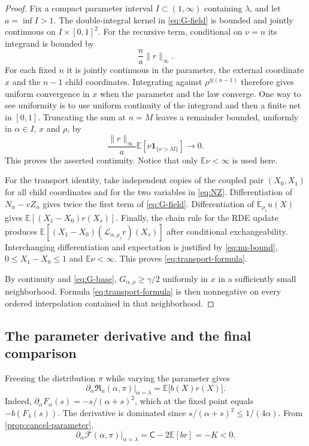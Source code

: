 \documentclass[11pt,a4paper]{article}
\numberwithin{equation}{section}
\theoremstyle{notethm}
\theoremstyle{definition}
\newcommand{\E}{\mathbb E}
\newcommand{\cL}{\mathcal L}
\newcommand{\cF}{\mathscr F}
\newcommand{\res}{\mathfrak R}
\begin{document}
\begin{proof}
Fix a compact parameter interval $I\subset(1,\infty)$ containing $\lambda$,
and let $a=\inf I>1$. The double-integral kernel in \eqref{eq:G-field} is
bounded and jointly continuous on $I\times[0,1]^2$.
For the recursive term, conditional on $\nu=n$ its integrand is bounded by
\begin{equation}\label{eq:nu-bound}
 \frac{n}{a}\|r\|_\infty.
\end{equation}
For each fixed $n$ it is jointly continuous in the parameter, the external
coordinate $x$ and the $n-1$ child coordinates. Integrating against
$\rho^{\otimes(n-1)}$ therefore gives uniform convergence in $x$ when the
parameter and the law converge. One way to see uniformity is to use uniform
continuity of the integrand and then a finite net in $[0,1]$.
Truncating the sum at $n=M$ leaves a remainder bounded, uniformly in
$\alpha\in I$, $x$ and $\rho$, by
\begin{equation}\label{eq:nu-tail}
 \frac{\|r\|_\infty}{a}\E[\nu\mathbf1_{\{\nu>M\}}]\longrightarrow0.
\end{equation}
This proves the asserted continuity. Notice that only $\E\nu<\infty$ is
used here.

For the transport identity, take independent copies of the coupled pair
$(X_0,X_1)$ for all child coordinates and for the two variables in
\eqref{eq:NZ}. Differentiation of $N_\alpha-vZ_\alpha$ gives twice the first
term of \eqref{eq:G-field}. Differentiation of $\E_{\rho_s}u(X)$ gives
$\E[(X_1-X_0)r(X_s)]$. Finally, the chain rule for the RDE update produces
$\E[(X_1-X_0)(\cL_{\alpha,\rho_s}r)(X_s)]$ after conditional
exchangeability. Interchanging differentiation and expectation is justified
by \eqref{eq:nu-bound}, $0\le X_1-X_0\le1$ and $\E\nu<\infty$.
This proves \eqref{eq:transport-formula}.

By continuity and \eqref{eq:G-base}, $G_{\alpha,\rho}\ge\gamma/2$ uniformly
in $x$ in a sufficiently small neighborhood. Formula
\eqref{eq:transport-formula} is then nonnegative on every ordered
interpolation contained in that neighborhood.
\end{proof}

\subsection{The parameter derivative and the final comparison}

Freezing the distribution $\pi$ while varying the parameter gives
\begin{equation}\label{eq:parameter-residual}
 \left.\partial_\alpha\res_u(\alpha,\pi)\right|_{\alpha=\lambda}
 =\E\bigl[b(X)r(X)\bigr].
\end{equation}
Indeed, $\partial_\alpha F_\alpha(s)=-s/(\alpha+s)^2$, which at the fixed
point equals $-b(F_\lambda(s))$. The derivative is dominated since
$s/(\alpha+s)^2\le1/(4\alpha)$. From \cref{prop:cancel-parameter},
\begin{equation}\label{eq:parameter-negative}
 \left.\partial_\alpha\cF(\alpha,\pi)\right|_{\alpha=\lambda}
 =\mathsf C-2\E[br]=-K<0.
\end{equation}
\end{document}
